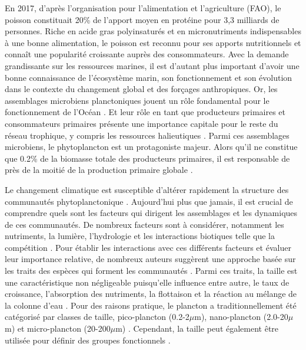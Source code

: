 \documentclass[12pt]{article}
\begin{document}
En 2017, d’après l’organisation pour l’alimentation et l’agriculture (FAO), le poisson constituait 20\% de l’apport moyen en protéine pour 3,3 milliards de personnes. Riche en acide gras polyinsaturés et en micronutriments indispensables à une bonne alimentation, le poisson est reconnu pour ses apports nutritionnels et connaît une popularité croissante auprès des consommateurs. Avec la demande grandissante sur les ressources marines, il est d’autant plus important d’avoir une bonne connaissance de l’écosystème marin, son fonctionnement et son évolution dans le contexte du changement global et des forçages anthropiques. Or, les assemblages microbiens planctoniques jouent un rôle fondamental pour le fonctionnement de l’Océan \citep{Azam1983}. Et leur rôle en tant que producteurs primaires et consommateurs primaires présente une importance capitale pour le reste du réseau trophique, y compris les ressources halieutiques \citep{Pomeroy1974}. Parmi ces assemblages microbiens, le phytoplancton est un protagoniste majeur. Alors qu’il ne constitue que 0.2\% de la biomasse totale des producteurs primaires, il est responsable de près de la moitié de la production primaire globale \citep{Field1998}. 

Le changement climatique est susceptible d’altérer rapidement la structure des communautés phytoplanctonique \citep{Litchman2008}. Aujourd’hui plus que jamais, il est crucial de comprendre quels sont les facteurs qui dirigent les assemblages et les dynamiques de ces communautés. De nombreux facteurs sont à considérer, notamment les nutriments, la lumière, l’hydrologie et les interactions biotiques telle que la compétition \citep{Brunet2006}. Pour établir les interactions avec ces différents facteurs et évaluer leur importance relative, de nombreux auteurs suggèrent une approche basée sur les traits des espèces qui forment les communautés \citep{Brunet2006, McGill2006, Litchman2008}. Parmi ces traits, la taille est une caractéristique non négligeable puisqu’elle influence entre autre, le taux de croissance, l’absorption des nutriments, la flottaison et la réaction au mélange de la colonne d’eau \citep{Brunet2006}. Pour des raisons pratique, le plancton a traditionnellement été catégorisé par classes de taille, pico-plancton (0.2-2$\mu$m), nano-plancton (2.0-20$\mu$m) et micro-plancton (20-200$\mu$m)  \citep{Pan2021}. Cependant, la taille peut également être utilisée pour définir des groupes fonctionnels \citep{LeQuere2005}. 
\end{document}
